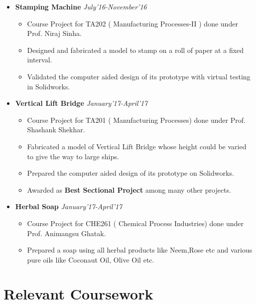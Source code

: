 \documentclass[10pt]{scrbook}
\begin{document}
\begin{itemize}
\item \textbf{Stamping Machine} \hfill\textit{July'16-November'16}
\begin{itemize}
\item Course Project for TA202 ( Manufacturing Processes-II ) done under Prof. Niraj Sinha.
\item Designed and fabricated a model to stamp on a roll of paper at a fixed interval.
\item Validated the computer aided design of its prototype with virtual testing in Solidworks.
\end{itemize}
\newpage 

\item \textbf{Vertical Lift Bridge} \hfill\textit{January'17-April'17}
\begin{itemize}
\item Course Project for TA201 ( Manufacturing Processes) done under Prof. Shashank Shekhar.
\item Fabricated a model of Vertical Lift Bridge whose height could be varied to give the way to large ships.
\item Prepared the computer aided design of its prototype on Solidworks.
\item Awarded as \textbf{Best Sectional Project} among many other projects. 
\end{itemize}

\item \textbf{Herbal Soap} \hfill\textit{January'17-April'17}
\begin{itemize}
\item Course Project for CHE261 ( Chemical Process Industries) done under Prof. Animangsu Ghatak.
\item Prepared a soap using all herbal products like Neem,Rose etc and various pure oils like Coconaut Oil, Olive Oil etc.
\end{itemize}
\end{itemize}


\section*{Relevant Coursework}
\end{document}
